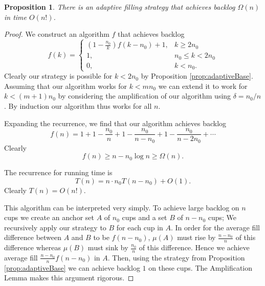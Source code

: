 \documentclass[twocolumn]{article}[10pt]
\newtheorem{proposition}{Proposition}
\begin{document}
\begin{proposition}
  \label{prop:factorialTimeAlg}
  There is an adaptive filling strategy that
  achieves backlog $\Omega(n)$ in time $O(n!)$.
\end{proposition}
\begin{proof}
  We construct an algorithm $f$ that achieves backlog 
  $$f(k) = \begin{cases}
    \left(1-\frac{n_0}{k}\right)f(k-n_0) + 1, &k \ge 2n_0\\
    1,  &n_0\le k < 2n_0 \\
    0, &k< n_0.
  \end{cases}$$
  Clearly our strategy is possible for $k<2n_0$ by Proposition
  \ref{prop:adaptiveBase}.
  Assuming that our algorithm works for $k<mn_0$ we can extend it to work for
  $k<(m+1)n_0$ by considering the amplification of our algorithm using $\delta = n_0/n$.
  By induction our algorithm thus works for all $n$.

  Expanding the recurrence, we find that our algorithm achieves backlog 
  $$f(n) = 1+ 1-\frac{n_0}{n} + 1-\frac{n_0}{n-n_0} + 1-\frac{n_0}{n-2n_0} + \cdots $$
  Clearly 
  $$f(n) \ge n - n_0 \log n \ge \Omega(n).$$

  The recurrence for running time is 
  $$T(n) = n \cdot n_0T(n-n_0)+O(1).$$
  Clearly $T(n) = O(n!)$.

  This algorithm can be interpreted very simply. To achieve large backlog on
  $n$ cups we create an anchor set $A$ of $n_0$ cups and a set $B$ of $n-n_0$
  cups; We recursively apply our strategy to $B$ for each cup in $A$. In
  order for the average fill difference between $A$ and $B$ to be $f(n-n_0)$,
  $\mu(A)$ must rise by $\frac{n-n_0}{n}$ of this difference whereas $\mu(B)$
  must sink by $\frac{n_0}{n}$ of this difference. Hence we achieve average
  fill $\frac{n-n_0}{n}f(n-n_0)$ in $A$. Then, using the strategy from
  Proposition \ref{prop:adaptiveBase} we can achieve backlog $1$ on these
  cups. The Amplification Lemma makes this argument rigorous.


\end{proof}
\end{document}
